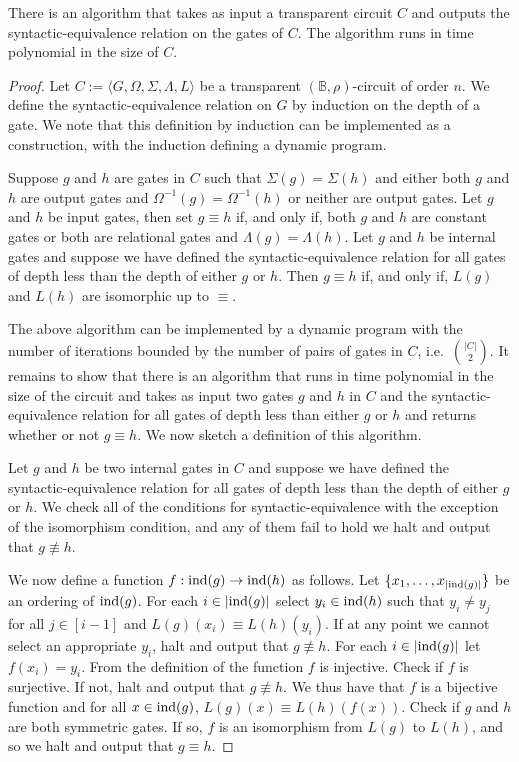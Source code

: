 \documentclass[../main/thesis.tex]{subfiles}
\begin{document}
\begin{lem}
  There is an algorithm that takes as input a transparent circuit $C$ and
  outputs the syntactic-equivalence relation on the gates of $C$. The algorithm
  runs in time polynomial in the size of $C$.
  \label{lem:transparent-syntactic-equiv}
\end{lem}
\begin{proof}
  Let $C := \langle G, \Omega, \Sigma, \Lambda, L \rangle$ be a transparent
  $(\mathbb{B}, \rho)$-circuit of order $n$. We define the syntactic-equivalence
  relation on $G$ by induction on the depth of a gate. We note that this
  definition by induction can be implemented as a construction, with the
  induction defining a dynamic program.
  
  Suppose $g$ and $h$ are gates in $C$ such that $\Sigma (g) = \Sigma(h)$ and
  either both $g$ and $h$ are output gates and $\Omega^{-1}(g) = \Omega^{-1}(h)$
  or neither are output gates. Let $g$ and $h$ be input gates, then set $g
  \equiv h$ if, and only if, both $g$ and $h$ are constant gates or both are
  relational gates and $\Lambda(g) = \Lambda (h)$. Let $g$ and $h$ be internal
  gates and suppose we have defined the syntactic-equivalence relation for all
  gates of depth less than the depth of either $g$ or $h$. Then $g \equiv h$ if,
  and only if, $L(g)$ and $L(h)$ are isomorphic up to $\equiv$.

  The above algorithm can be implemented by a dynamic program with the number of
  iterations bounded by the number of pairs of gates in $C$, i.e.\ ${\vert C
    \vert} \choose{2}$. It remains to show that there is an algorithm that runs
  in time polynomial in the size of the circuit and takes as input two gates $g$
  and $h$ in $C$ and the syntactic-equivalence relation for all gates of depth
  less than either $g$ or $h$ and returns whether or not $g \equiv h$. We now
  sketch a definition of this algorithm.
  
  Let $g$ and $h$ be two internal gates in $C$ and suppose we have defined the
  syntactic-equivalence relation for all gates of depth less than the depth of
  either $g$ or $h$. We check all of the conditions for syntactic-equivalence
  with the exception of the isomorphism condition, and any of them fail to hold
  we halt and output that $g \not\equiv h$.

  We now define a function $f: \text{\upshape ind}(g) \rightarrow \text{\upshape ind}(h)$ as follows. Let
  $\{x_1, \ldots, x_{\vert \text{\upshape ind}(g)\vert}\}$ be an ordering of $\text{\upshape ind}(g)$. For
  each $i \in \vert \text{\upshape ind}(g) \vert$ select $y_i \in \text{\upshape ind}(h)$ such that $y_i \neq
  y_j$ for all $j \in [i-1]$ and $L(g)(x_i) \equiv L(h)(y_i)$. If at any point
  we cannot select an appropriate $y_i$, halt and output that $g \not\equiv h$.
  For each $i \in \vert \text{\upshape ind}(g) \vert$ let $f(x_i) = y_i$. From the definition
  of the function $f$ is injective. Check if $f$ is surjective. If not, halt and
  output that $g \not\equiv h$. We thus have that $f$ is a bijective function
  and for all $x \in \text{\upshape ind}(g)$, $L(g)(x) \equiv L(h)(f(x))$. Check if $g$ and $h$
  are both symmetric gates. If so, $f$ is an isomorphism from $L(g)$ to $L(h)$,
  and so we halt and output that $g \equiv h$.


\end{proof}
\end{document}
